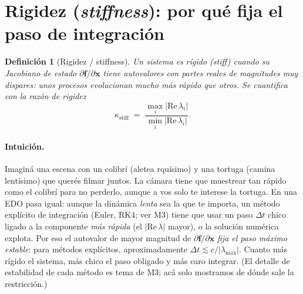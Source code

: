 \documentclass[11pt,a4paper]{article}
\newtheorem{definition}{Definición}
\begin{document}
\section{Rigidez (\emph{stiffness}): por qué fija el paso de integración}

\begin{definition}[Rigidez / stiffness]
Un sistema es \emph{rígido} (\emph{stiff}) cuando su Jacobiano de estado $\partial\mathbf{f}/\partial\mathbf{x}$ tiene autovalores con partes reales de magnitudes muy dispares: unos procesos evolucionan mucho más rápido que otros. Se cuantifica con la \emph{razón de rigidez}
\begin{equation}
\kappa_{\text{stiff}} \;=\; \frac{\max_i |\mathrm{Re}\,\lambda_i|}{\min_i |\mathrm{Re}\,\lambda_i|}.
\end{equation}
\end{definition}

\paragraph{Intuición.} Imaginá una escena con un colibrí (aletea rquísimo) y una tortuga (camina lentísimo) que querés filmar juntos. La cámara tiene que muestrear tan rápido como el colibrí para no perderlo, aunque a vos solo te interese la tortuga. En una EDO pasa igual: aunque la dinámica \emph{lenta} sea la que te importa, un método explícito de integración (Euler, RK4; ver M3) tiene que usar un paso $\Delta t$ chico ligado a la componente \emph{más rápida} (el $|\mathrm{Re}\,\lambda|$ mayor), o la solución numérica explota. Por eso el autovalor de mayor magnitud de $\partial\mathbf{f}/\partial\mathbf{x}$ \emph{fija el paso máximo estable}: para métodos explícitos, aproximadamente $\Delta t \lesssim c/|\lambda_{\max}|$. Cuanto más rígido el sistema, más chico el paso obligado y más caro integrar. (El detalle de estabilidad de cada método es tema de M3; acá solo mostramos de dónde sale la restricción.)
\end{document}
